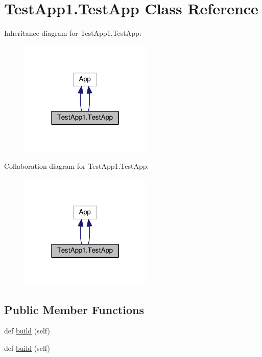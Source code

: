 \hypertarget{classTestApp1_1_1TestApp}{}\section{Test\+App1.\+Test\+App Class Reference}
\label{classTestApp1_1_1TestApp}


Inheritance diagram for Test\+App1.\+Test\+App\+:
\nopagebreak
\begin{figure}[H]
\begin{center}
\leavevmode
\includegraphics[width=178pt]{classTestApp1_1_1TestApp__inherit__graph}
\end{center}
\end{figure}


Collaboration diagram for Test\+App1.\+Test\+App\+:
\nopagebreak
\begin{figure}[H]
\begin{center}
\leavevmode
\includegraphics[width=178pt]{classTestApp1_1_1TestApp__coll__graph}
\end{center}
\end{figure}
\subsection*{Public Member Functions}
\begin{DoxyCompactItemize}
\item 
def \hyperlink{classTestApp1_1_1TestApp_a3f9852f574a1b9273b95c63de9dbfc64}{build} (self)
\item 
def \hyperlink{classTestApp1_1_1TestApp_a3f9852f574a1b9273b95c63de9dbfc64}{build} (self)
\end{DoxyCompactItemize}
